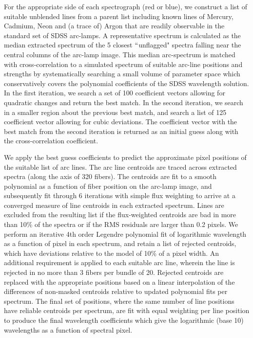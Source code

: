 \documentclass[12pt,preprint]{aastex}
\begin{document}
For the appropriate side of each spectrograph (red or blue), we 
construct a list of suitable unblended lines from a parent list including
known lines of Mercury, Cadmium, Neon and (a trace of) Argon 
that are readily observable in the standard set of SDSS arc-lamps. 
A representative spectrum is calculated as the median extracted spectrum
of the 5 closest $``$unflagged" spectra falling near the central columns 
of the arc-lamp image.  This median arc-spectrum is matched with 
cross-correlation to a simulated spectrum of suitable arc-line positions and 
strengths by systematically searching a small volume of 
parameter space which conservatively covers
the polynomial coefficients of the SDSS wavelength solution.
In the first iteration, we search a set of 
100 coefficient vectors allowing for quadratic changes and return 
the best match.  In the second iteration, we search in a smaller region
about the previous best match, and search a list of 125 coefficient vector
allowing for cubic deviations.  The coefficient vector with the best
match from the second iteration is returned as an initial guess along with
the cross-correlation coefficient.  

We apply the best guess coefficients to predict the approximate pixel 
positions of the suitable list of arc lines.  The arc line centroids
are traced across extracted spectra (along the axis of 320 fibers).
The centroids are fit to a smooth polynomial as a function of fiber
position on the arc-lamp image, and subsequently fit through 6 iterations
with simple flux weighting to arrive at a converged measure of line 
centroids in each extracted spectrum.  Lines are excluded from the resulting
list if the flux-weighted centroids are bad in more than 10\% of the
spectra or if the RMS residuals are larger than 0.2 pixels.
We perform an iterative 4th order Legendre polynomial fit of 
logarithmic wavelength as a function of pixel in each spectrum, 
and retain a list of rejected centroids, 
which have deviations relative to the model of
10\% of a pixel width.  An additional requirement is applied to each
suitable arc line, wherein the line is rejected in no more than 3 fibers
per bundle of 20.  Rejected centroids are replaced with the appropriate
positions based on a linear interpolation of the differences of non-masked
centroids relative to updated polynomial fits per spectrum.
The final set of positions, where the same number of line positions have
reliable centroids per spectrum, are fit with equal weighting per line
position to produce the final wavelength
coefficients which give the logarithmic (base 10) wavelengths as a function
of spectral pixel.
\end{document}
